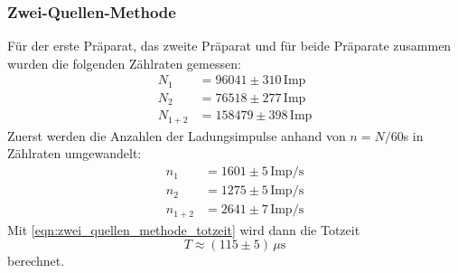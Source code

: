 \documentclass[titlepage = firstcover]{scrartcl}
\begin{document}
      \subsubsection{Zwei-Quellen-Methode}
        Für der erste Präparat, das zweite Präparat und für beide Präparate zusammen wurden die folgenden Zählraten gemessen:
        \begin{align*}
          N_1 &= 96041 \pm 310 \, \text{Imp} \\
          N_2 &= 76518 \pm 277 \, \text{Imp} \\
          N_{1+2} &= 158479 \pm 398 \, \text{Imp}
        \end{align*}
        Zuerst werden die Anzahlen der Ladungsimpulse anhand von $n = N / 60$s in Zählraten umgewandelt:
        \begin{align*}
            n_1 &= 1601 \pm 5 \, \text{Imp/s} \\
            n_2 &= 1275 \pm 5 \, \text{Imp/s} \\
            n_{1+2} &= 2641 \pm 7 \, \text{Imp/s}
          \end{align*}
        Mit \autoref{eqn:zwei_quellen_methode_totzeit} wird dann die Totzeit
        \begin{equation*}
          T \approx (115 \pm 5) \, \mu\text{s}
        \end{equation*}
        berechnet.
\end{document}
